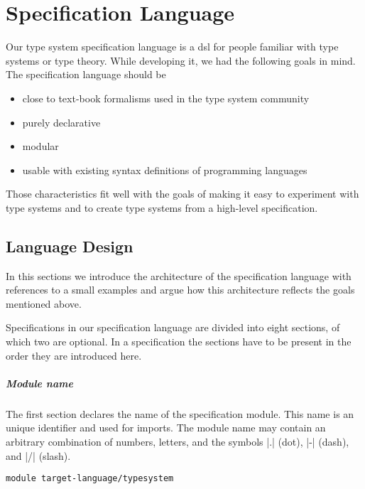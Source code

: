 \chapter{Specification Language}
\label{cha:spec-lang}
Our type system specification language is a \gls{dsl} for people
familiar with type systems or type theory. While developing it, we had
the following goals in mind. The specification language should be

\begin{itemize}
\item close to text-book formalisms used in the type system community
\item purely declarative
\item modular
\item usable with existing syntax definitions of programming languages
\end{itemize}

Those characteristics fit well with the goals of making it easy to
experiment with type systems and to create type systems from a
high-level specification.
\section{Language Design}
\label{sec:design--architecture}
In this sections we introduce the architecture of the specification
language with references to a small examples and argue how this
architecture reflects the goals mentioned above.

Specifications in our specification language are divided into eight
sections, of which two are optional. In a specification the sections
have to be present in the order they are introduced here.

\paragraph{Module name} The first section declares the name of the
specification module. This name is an unique identifier and used for
imports. The module name may contain an arbitrary combination of
numbers, letters, and the symbols \code|.| (dot), \code|-| (dash), and
\code|/| (slash).

\begin{example}{}
\begin{lstlisting}[language=sltc]
module target-language/typesystem
\end{lstlisting}
\label{ex:module-section}
\end{example}

